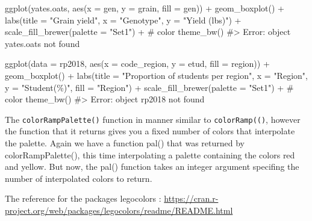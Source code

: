\documentclass[
  letterpaper,
  DIV=11,
  numbers=noendperiod]{scrreprt}
\newenvironment{Shaded}{\begin{snugshade}}{\end{snugshade}}
\newcommand{\AttributeTok}[1]{\textcolor[rgb]{0.40,0.45,0.13}{#1}}
\newcommand{\CommentTok}[1]{\textcolor[rgb]{0.37,0.37,0.37}{#1}}
\newcommand{\FunctionTok}[1]{\textcolor[rgb]{0.28,0.35,0.67}{#1}}
\newcommand{\NormalTok}[1]{\textcolor[rgb]{0.00,0.23,0.31}{#1}}
\newcommand{\SpecialCharTok}[1]{\textcolor[rgb]{0.37,0.37,0.37}{#1}}
\newcommand{\StringTok}[1]{\textcolor[rgb]{0.13,0.47,0.30}{#1}}
\begin{document}
\begin{Shaded}
\begin{Highlighting}[]


\FunctionTok{ggplot}\NormalTok{(yates.oats, }\FunctionTok{aes}\NormalTok{(}\AttributeTok{x =}\NormalTok{ gen, }\AttributeTok{y =}\NormalTok{ grain, }\AttributeTok{fill =}\NormalTok{ gen)) }\SpecialCharTok{+}
  \FunctionTok{geom\_boxplot}\NormalTok{() }\SpecialCharTok{+}
  \FunctionTok{labs}\NormalTok{(}\AttributeTok{title =} \StringTok{"Grain yield"}\NormalTok{, }\AttributeTok{x =} \StringTok{"Genotype"}\NormalTok{, }\AttributeTok{y =} \StringTok{"Yield (lbs)"}\NormalTok{) }\SpecialCharTok{+} 
  \FunctionTok{scale\_fill\_brewer}\NormalTok{(}\AttributeTok{palette =} \StringTok{"Set1"}\NormalTok{) }\SpecialCharTok{+} \CommentTok{\# color}
  \FunctionTok{theme\_bw}\NormalTok{()}
\CommentTok{\#\textgreater{} Error: object \textquotesingle{}yates.oats\textquotesingle{} not found}


\FunctionTok{ggplot}\NormalTok{(}\AttributeTok{data =}\NormalTok{ rp2018, }\FunctionTok{aes}\NormalTok{(}\AttributeTok{x =}\NormalTok{ code\_region, }\AttributeTok{y =}\NormalTok{ etud, }\AttributeTok{fill =}\NormalTok{ region)) }\SpecialCharTok{+}
  \FunctionTok{geom\_boxplot}\NormalTok{() }\SpecialCharTok{+}
  \FunctionTok{labs}\NormalTok{(}\AttributeTok{title =} \StringTok{"Proportion of students per region"}\NormalTok{, }\AttributeTok{x =} \StringTok{"Region"}\NormalTok{, }\AttributeTok{y =} \StringTok{"Student(\%)"}\NormalTok{, }\AttributeTok{fill =} \StringTok{"Region"}\NormalTok{) }\SpecialCharTok{+} 
  \FunctionTok{scale\_fill\_brewer}\NormalTok{(}\AttributeTok{palette =} \StringTok{"Set1"}\NormalTok{) }\SpecialCharTok{+} \CommentTok{\# color}
  \FunctionTok{theme\_bw}\NormalTok{() }
\CommentTok{\#\textgreater{} Error: object \textquotesingle{}rp2018\textquotesingle{} not found}
\end{Highlighting}
\end{Shaded}

The \texttt{colorRampPalette()} function in manner similar to
\texttt{colorRamp(()}, however the function that it returns gives you a
fixed number of colors that interpolate the palette. Again we have a
function pal() that was returned by colorRampPalette(), this time
interpolating a palette containing the colors red and yellow. But now,
the pal() function takes an integer argument specifing the number of
interpolated colors to return.

The reference for the packages legocolors :
\url{https://cran.r-project.org/web/packages/legocolors/readme/README.html}
\end{document}
